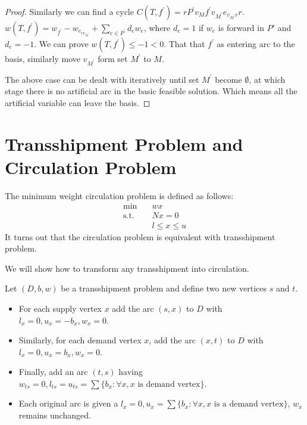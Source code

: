 \begin{proof}
						Similarly we can find a cycle $C(T, f^\prime) = rP^\prime v_M f^\prime v_{M^\prime}e_{v_{M^\prime}r}r$. $w(T, f^\prime) = w_{f^\prime} - w_{e_{rv_{M^\prime}}} + \sum_{e \in P^\prime} d_e w_e$, where $d_e = 1$ if $w_e$ is forward in $P\prime$ and $d_e = -1$. We can prove $w(T, f^\prime) \le -1 < 0$. That that $f^\prime$ as entering arc to the basis, similarly move $v_{M^\prime}$ form set $M^\prime$ to $M$.

						The above case can be dealt with iteratively until set $M^\prime$ become $\emptyset$, at which stage there is no artificial arc in the basic feasible solution. Which means all the artificial variable can leave the basis.
					\end{proof}


			\section{Transshipment Problem and Circulation Problem}
				\begin{definition}
					The minimum weight circulation problem is defined as follows:
					\begin{align}
						\min \quad & wx\\
						\text{s.t.} \quad & Nx = 0\\
							&l \le x \le u
					\end{align}
					It turns out that the circulation problem is equivalent with transshipment problem.
				\end{definition}

				We will show how to transform any transshipment into circulation.

				Let $(D, b, w)$ be a transshipment problem and define two new vertices $s$ and $t$. 
				\begin{itemize}
					\item For each supply vertex $x$ add the arc $(s, x)$ to $D$ with $l_x = 0, u_x = -b_x, w_x = 0$. 
					\item Similarly, for each demand vertex $x$, add the arc $(x, t)$ to $D$ with $l_x = 0, u_x = b_x, w_x = 0$. 
					\item Finally, add an arc $(t, s)$ having $w_{ts} = 0, l_{ts} = u_{ts} = \sum\{b_x: \forall x, x \text{ is demand vertex}\}$. 
					\item Each original arc is given a $l_x = 0, u_x = \sum\{b_x : \forall x, x \text{ is a demand vertex}\}$, $w_x$ remains unchanged.
				\end{itemize}

